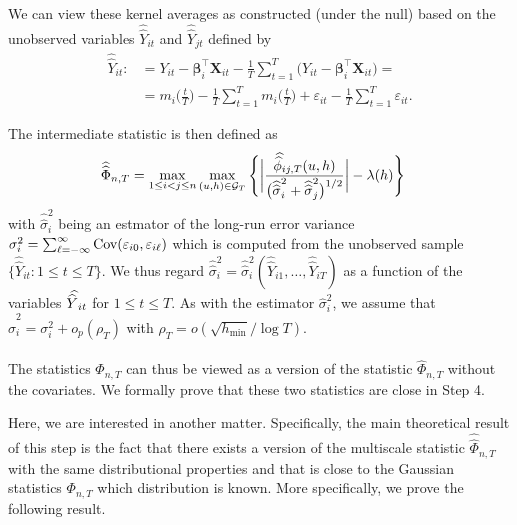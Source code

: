 \documentclass[a4paper,12pt]{article}
\newcommand{\doublehat}[1]{\skew{5.5}\widehat{\widehat{#1}}}
\newcommand{\doublehattwo}[1]{\widehat{\widehat{#1}}}
\begin{document}
We can view these kernel averages as constructed (under the null) based on the unobserved variables $\doublehattwo{Y}_{it}$ and  $\doublehattwo{Y}_{jt}$ defined by 
\begin{align*}
\doublehattwo{Y}_{it} :&= Y_{it} - \bm{\beta}_i^\top \mathbf{X}_{it} -  \frac{1}{T}\sum_{t=1}^T \big(Y_{it} - \bm{\beta}_i^\top \mathbf{X}_{it}\big) =\\
&=m_i \Big( \frac{t}{T} \Big)  - \frac{1}{T}\sum_{t=1}^T  m_i \Big( \frac{t}{T} \Big) + \varepsilon_{it} - \frac{1}{T}\sum_{t=1}^T \varepsilon_{it}.
\end{align*}

The intermediate statistic is then defined as 
\begin{align}\label{eqA:Phi_doublehat}
\doublehattwo{\Phi}_{n,T} &= \max_{1 \le i < j \le n}\max_{(u,h) \in \mathcal{G}_T} \Bigg\{\bigg|\frac{\doublehat{\phi}_{ij,T}(u,h)}{\big(\doublehattwo{\sigma}_i^2 + \doublehattwo{\sigma}_j^2\big)^{1/2}}\bigg| - \lambda(h)\Bigg\}
\end{align}
with $\doublehattwo{\sigma}_i^2$ being an estmator of the long-run error variance $\sigma_i^2 = \sum\nolimits_{\ell=-\infty}^{\infty} \textnormal{Cov}(\varepsilon_{i0}, \varepsilon_{i\ell})$ which is computed from the unobserved sample $\{ \doublehattwo{Y}_{it} : 1 \le t \le T \}$. We thus regard $\doublehattwo{\sigma}_i^2 = \doublehattwo{\sigma}_i^2(\doublehattwo{Y}_{i1},\ldots,\doublehattwo{Y}_{iT})$ as a function of the variables $\doublehat{Y}_{it}$ for $1 \le t \le T$. As with the estimator $\widehat{\sigma}_i^2$, we assume that $\doublehattwo{\sigma}_i^2 = \sigma_i^2 + o_p(\rho_T)$ with $\rho_T = o(\sqrt{h_{\min}}/\log T)$. 

The statistics $\doublehattwo{\Phi}_{n,T}$ can thus be viewed as a version of the statistic $\widehat{\Phi}_{n,T}$ without the covariates. We formally prove that these two statistics are close in Step 4.

Here, we are interested in another matter. Specifically, the main theoretical result of this step is the fact that there exists a version of the multiscale statistic $\doublehattwo{\Phi}_{n,T}$ with the same distributional properties and that is close to the Gaussian statistics $\Phi_{n,T}$ which distribution is known. More specifically, we prove the following result. 
\end{document}

